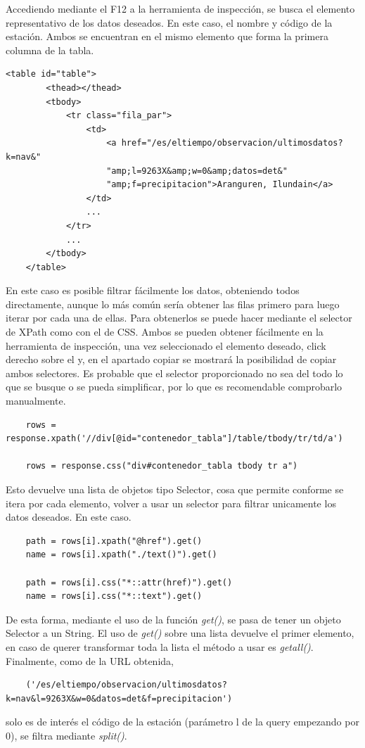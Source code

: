 Accediendo mediante el F12 a la herramienta de inspección, se busca el elemento representativo de los datos deseados. En este caso, el nombre y código de la estación. Ambos se encuentran en el mismo elemento que forma la primera columna de la tabla.\newline

\begin{lstlisting}[caption={Estructura HTML de los datos deseados Aemet}]
	<table id="table">
		<thead></thead>
		<tbody>
			<tr class="fila_par">
				<td>
					<a href="/es/eltiempo/observacion/ultimosdatos?k=nav&"
					"amp;l=9263X&amp;w=0&amp;datos=det&"
					"amp;f=precipitacion">Aranguren, Ilundain</a>
				</td>
				...
			</tr>
			...
		</tbody>
	</table>
\end{lstlisting}

En este caso es posible filtrar fácilmente los datos, obteniendo todos directamente, aunque lo más común sería obtener las filas primero para luego iterar por cada una de ellas. Para obtenerlos se puede hacer mediante el selector de XPath como con el de CSS.\newline
\newline
Ambos se pueden obtener fácilmente en la herramienta de inspección, una vez seleccionado el elemento deseado, click derecho sobre el y, en el apartado copiar se mostrará la posibilidad de copiar ambos selectores. Es probable que el selector proporcionado no sea del todo lo que se busque o se pueda simplificar, por lo que es recomendable comprobarlo manualmente.\newline

\begin{lstlisting}
	rows = response.xpath('//div[@id="contenedor_tabla"]/table/tbody/tr/td/a')
	
	rows = response.css("div#contenedor_tabla tbody tr a")
\end{lstlisting}

Esto devuelve una lista de objetos tipo Selector, cosa que permite conforme se itera por cada elemento, volver a usar un selector para filtrar unicamente los datos deseados. En este caso.

\begin{lstlisting}
	path = rows[i].xpath("@href").get()
	name = rows[i].xpath("./text()").get()
	
	path = rows[i].css("*::attr(href)").get()
	name = rows[i].css("*::text").get()
\end{lstlisting}

De esta forma, mediante el uso de la función \textit{get()}, se pasa de tener un objeto Selector a un String. El uso de \textit{get()} sobre una lista devuelve el primer elemento, en caso de querer transformar toda la lista el método a usar es \textit{getall()}.\newline
\newline
Finalmente, como de la URL obtenida,
\begin{verbatim}
	('/es/eltiempo/observacion/ultimosdatos?k=nav&l=9263X&w=0&datos=det&f=precipitacion')
\end{verbatim}
solo es de interés el código de la estación (parámetro l de la query empezando por 0), se filtra mediante \textit{split()}.

